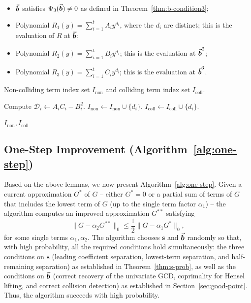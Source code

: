 \documentclass{article}
\numberwithin{equation}{section}
\begin{document}
\begin{algorithm}
\caption{Collision Detection Subalgorithm}
\label{alg:collideTest}
\begin{algorithmic}[1]
\Require
    \begin{itemize}
        \item $\vec{\boldsymbol{b}}$ satisfies $\Psi_3(\vec{\boldsymbol{b}}) \neq 0$ as defined in Theorem~\ref{thm:b-condition3};
        \item Polynomial $R_1(y) = \sum_{i=1}^{t} A_i y^{d_i}$, where the $d_i$ are distinct; this is the evaluation of $R$ at $\vec{\boldsymbol{b}}$;
        \item Polynomial $R_2(y) = \sum_{i=1}^{t} B_i y^{d_i}$; this is the evaluation at $\vec{\boldsymbol{b}}^2$;
        \item Polynomial $R_3(y) = \sum_{i=1}^{t} C_i y^{d_i}$; this is the evaluation at $\vec{\boldsymbol{b}}^3$.
    \end{itemize}
\Ensure
    Non-colliding term index set $I_{\text{non}}$ and colliding term index set $I_{\text{coll}}$.

    \State Compute $\mathcal{D}_i \gets A_i C_i - B_i^2$.
        \State $I_{\text{non}} \gets I_{\text{non}} \cup \{d_i\}$.
    \Else
        \State $I_{\text{coll}} \gets I_{\text{coll}} \cup \{d_i\}$.
    \EndIf
\EndFor

\State \Return $I_{\text{non}}, I_{\text{coll}}$
\end{algorithmic}
\end{algorithm}



\subsection{One-Step Improvement (Algorithm~\ref{alg:one-step})}
\label{sec:one-step}

Based on the above lemmas, we now present Algorithm~\ref{alg:one-step}. Given a current approximation $G^*$ of $G$ -- either $G^* = 0$ or a partial sum of terms of $G$ that includes the lowest term of $G$ (up to the single term factor $\alpha_1$) -- the algorithm computes an improved approximation $G^{**}$ satisfying
\[
\bigl\| G - \alpha_2 G^{**} \bigr\|_0 \le \frac{1}{2} \bigl\| G - \alpha_1 G^* \bigr\|_0,
\]
for some single terms $\alpha_1, \alpha_2$.
%
The algorithm chooses $\mathbf{s}$ and $\vec{\boldsymbol{b}}$ randomly so that, with high probability, all the required conditions hold simultaneously: the three conditions on $\mathbf{s}$ (leading coefficient separation, lowest-term separation, and half-remaining separation) as established in Theorem~\ref{thm:s-prob}, as well as the conditions on $\vec{\boldsymbol{b}}$ (correct recovery of the univariate GCD, coprimality for Hensel lifting, and correct collision detection) as established in Section~\ref{sec:good-point}. Thus, the algorithm succeeds with high probability.
\end{document}
